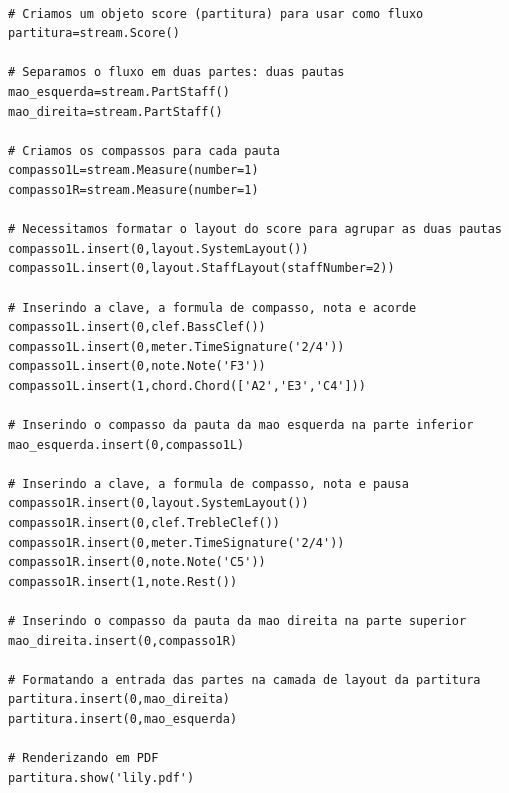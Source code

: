 \documentclass[
	12pt,				%
	openright,			%
	twoside,			%
	a4paper,			%
	english,			%
	french,				%
	spanish,			%
	brazil				%
	]{abntex2}
\begin{document}
\begin{lstlisting}

# Criamos um objeto score (partitura) para usar como fluxo
partitura=stream.Score()

# Separamos o fluxo em duas partes: duas pautas
mao_esquerda=stream.PartStaff()
mao_direita=stream.PartStaff()

# Criamos os compassos para cada pauta 
compasso1L=stream.Measure(number=1)
compasso1R=stream.Measure(number=1)

# Necessitamos formatar o layout do score para agrupar as duas pautas
compasso1L.insert(0,layout.SystemLayout())
compasso1L.insert(0,layout.StaffLayout(staffNumber=2))

# Inserindo a clave, a formula de compasso, nota e acorde
compasso1L.insert(0,clef.BassClef())
compasso1L.insert(0,meter.TimeSignature('2/4'))
compasso1L.insert(0,note.Note('F3'))
compasso1L.insert(1,chord.Chord(['A2','E3','C4']))

# Inserindo o compasso da pauta da mao esquerda na parte inferior
mao_esquerda.insert(0,compasso1L)

# Inserindo a clave, a formula de compasso, nota e pausa
compasso1R.insert(0,layout.SystemLayout())
compasso1R.insert(0,clef.TrebleClef())
compasso1R.insert(0,meter.TimeSignature('2/4'))
compasso1R.insert(0,note.Note('C5'))
compasso1R.insert(1,note.Rest())

# Inserindo o compasso da pauta da mao direita na parte superior
mao_direita.insert(0,compasso1R)

# Formatando a entrada das partes na camada de layout da partitura
partitura.insert(0,mao_direita)
partitura.insert(0,mao_esquerda)

# Renderizando em PDF
partitura.show('lily.pdf')
\end{lstlisting}
\end{document}

